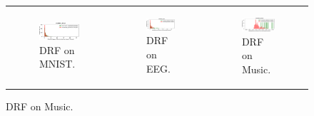 \documentclass[conference]{IEEEtran}
\begin{document}
\begin{figure}[t]
\begin{tabular}{lll}
\begin{subfigure}[b]{0.31\textwidth}
\includegraphics[scale=0.445]{figs_pdf/DGPRFF_MNIST.pdf}
\caption{DRF on MNIST.}
\end{subfigure}
&
\begin{subfigure}[b]{0.31\textwidth}
\includegraphics[scale=0.445]{figs_pdf/DGPRFF_EEG.pdf}
\caption{DRF on EEG.}
\end{subfigure}
&
\begin{subfigure}[b]{0.31\textwidth}
\includegraphics[scale=0.445]{figs_pdf/DGPRFF_Music.pdf}
\caption{DRF on Music.}
\end{subfigure}
\\


\end{tabular}
\end{figure}
\end{document}
